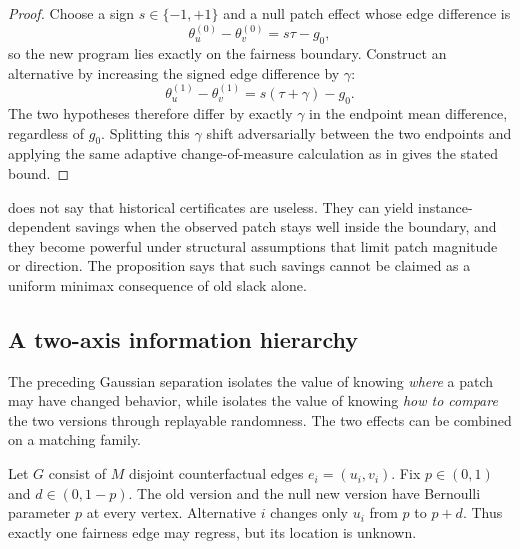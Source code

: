 \begin{proof}
Choose a sign $s\in\{-1,+1\}$ and a null patch effect whose edge difference is
\begin{equation}\label{eq:appendix-07-regression-consequences-006}
\theta_u^{(0)}-\theta_v^{(0)}=s\tau-g_0,
\end{equation}
so the new program lies exactly on the fairness boundary.  Construct an
alternative by increasing the signed edge difference by $\gamma$:
\begin{equation}\label{eq:appendix-07-regression-consequences-007}
\theta_u^{(1)}-\theta_v^{(1)}=s(\tau+\gamma)-g_0.
\end{equation}
The two hypotheses therefore differ by exactly $\gamma$ in the endpoint mean
difference, regardless of $g_0$.  Splitting this $\gamma$ shift adversarially
between the two endpoints and applying the same adaptive change-of-measure
calculation as in  gives the stated bound.
\end{proof}

 does not say that historical certificates are
useless.  They can yield instance-dependent savings when the observed patch stays
well inside the boundary, and they become powerful under structural assumptions
that limit patch magnitude or direction.  The proposition says that such savings
cannot be claimed as a uniform minimax consequence of old slack alone.


\subsection{A two-axis information hierarchy}

The preceding Gaussian separation isolates the value of knowing \emph{where} a
patch may have changed behavior, while  isolates
the value of knowing \emph{how to compare} the two versions through replayable
randomness.  The two effects can be combined on a matching family.

Let \(G\) consist of \(M\) disjoint counterfactual edges
\(e_i=(u_i,v_i)\).  Fix \(p\in(0,1)\) and \(d\in(0,1-p)\).  The old version and
the null new version have Bernoulli parameter \(p\) at every vertex.  Alternative
\(i\) changes only \(u_i\) from \(p\) to \(p+d\).  Thus exactly one fairness edge
may regress, but its location is unknown.

